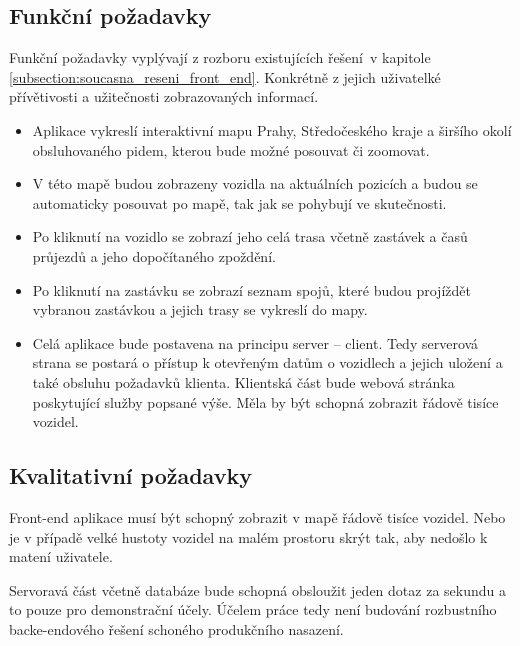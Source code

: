 \subsection{Funkční požadavky}

Funkční požadavky vyplývají z rozboru existujících řešení v kapitole \ref{subsection:soucasna_reseni_front_end}. Konkrétně z jejich uživatelké přívětivosti a užitečnosti zobrazovaných informací.

\begin{itemize}

	\item Aplikace vykreslí interaktivní mapu Prahy, Středočeského kraje a širšího okolí obsluhovaného \gls{pid}em, kterou bude možné posouvat či zoomovat.

	\item V této mapě budou zobrazeny vozidla na aktuálních pozicích a budou se automaticky posouvat po mapě, tak jak se pohybují ve skutečnosti.

	\item Po kliknutí na vozidlo se zobrazí jeho celá trasa včetně zastávek a časů průjezdů a jeho dopočítaného zpoždění.

	\item Po kliknutí na zastávku se zobrazí seznam spojů, které budou projíždět vybranou zastávkou a jejich trasy se vykreslí do mapy.

	\item Celá aplikace bude postavena na principu server -- client. Tedy serverová strana se postará o přístup k otevřeným datům o vozidlech a jejich uložení a také obsluhu požadavků klienta. Klientská část bude webová stránka poskytující služby popsané výše. Měla by být schopná zobrazit řádově tisíce vozidel.

\end{itemize}

\subsection{Kvalitativní požadavky}

Front-end aplikace musí být schopný zobrazit v mapě řádově tisíce vozidel. Nebo je v případě velké hustoty vozidel na malém prostoru skrýt tak, aby nedošlo k matení uživatele.

\bigbreak

Servoravá část včetně databáze bude schopná obsloužit jeden dotaz za sekundu a to pouze pro demonstrační účely. Účelem práce tedy není budování rozbustního backe-endového řešení schoného produkčního nasazení.

